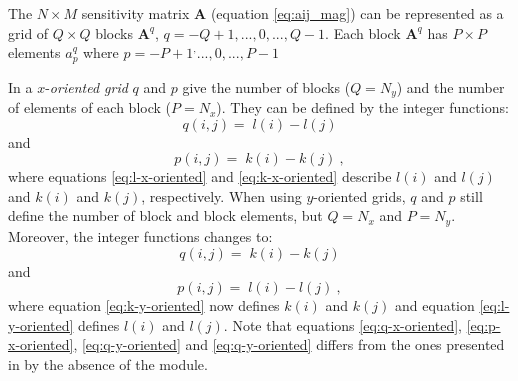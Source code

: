 The $N \times M$ sensitivity matrix  $\mathbf{A}$ (equation \ref{eq:aij_mag}) can be represented as a grid of $Q \times Q$ blocks $\mathbf{A}^q$, $q = -Q+1,...,0,..., Q-1$. Each block  $\mathbf{A}^q$ has $P \times P$ elements $a^{q}_p$ where $p = -P+1^,...,0,...,P-1$

In a $x$-\textit{oriented grid} $q$ and $p$ give the number of blocks ($Q = N_{y}$) and the number of elements of each block ($P = N_{x}$). They can be defined by the integer functions:
\begin{equation}
q(i, j) = \; l(i) - l(j)
\label{eq:q-x-oriented}
\end{equation}
and
\begin{equation}
p(i, j) = \; k(i) - k(j) \: ,
\label{eq:p-x-oriented}
\end{equation}
where equations \ref{eq:l-x-oriented} and \ref{eq:k-x-oriented} describe $l(i)$ and $l(j)$ and $k(i)$ and $k(j)$, respectively. When using $y$-oriented grids, $q$ and $p$ still define the number of block and block elements, but $Q = N_{x}$ and $P = N_{y}$. Moreover, the integer functions changes to:
\begin{equation}
q(i, j) = \; k(i) - k(j) 
\label{eq:q-y-oriented}
\end{equation}
and
\begin{equation}
p(i, j) = \; l(i) - l(j) \: ,
\label{eq:p-y-oriented}
\end{equation}
where equation \ref{eq:k-y-oriented} now defines $k(i)$ and $k(j)$ and equation \ref{eq:l-y-oriented} defines $l(i)$ and $l(j)$. Note that equations \ref{eq:q-x-oriented}, \ref{eq:p-x-oriented}, \ref{eq:q-y-oriented} and \ref{eq:q-y-oriented} differs from the ones presented in \cite{takahashi2020convolutional} by the absence of the module.

